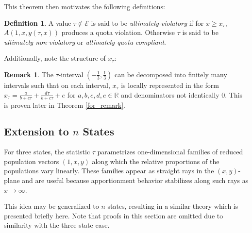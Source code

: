\documentclass[11pt]{article}
\theoremstyle{definition}
\newtheorem{definition}[theorem]{Definition}
\newtheorem{remark}[theorem]{Remark}
\theoremstyle{definition}
\begin{document}
This theorem then motivates the following definitions: 
\begin{definition}\label{Violatory_tau_def}
A value $\tau \notin \mathcal{E}$ is said to be \textit{ultimately-violatory} if for $x \geq x_\tau$, $A(1,x,y(\tau, x))$ produces a quota violation. Otherwise $\tau$ is said to be \textit{ultimately non-violatory} or \textit{ultimately quota compliant}.
\end{definition} 
Additionally, note the structure of $x_\tau$:
\begin{remark}\label{xtau_structure}
The $\tau$-interval $(-\frac{1}{3}, \frac{1}{3})$ can be decomposed into  finitely many intervals such that on each interval, $x_\tau$ is locally represented in the form $x_\tau = \frac{a}{b+c\tau} + \frac{d\tau}{b+c\tau} + e$ for $a,b,c,d,e \in \mathbb{R}$ and denominators not identically $0$. This is proven later in Theorem \ref{for_remark}.


    
\end{remark}

\subsection{Extension to $n$ States}
For three states, the statistic $\tau$ parametrizes one-dimensional families of reduced population vectors $(1,x,y)$ along which the relative proportions of the populations vary linearly. These families appear as straight rays in the $(x,y)$-plane and are useful because apportionment behavior stabilizes along such rays as $x \to \infty$.

This idea may be generalized to $n$ states, resulting in a similar theory which is presented briefly here. Note that proofs in this section are omitted due to similarity with the three state case.
\end{document}
